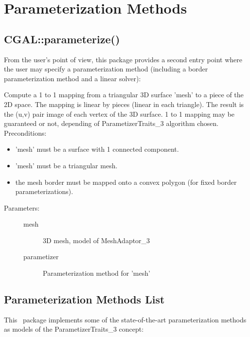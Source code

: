 \section{Parameterization Methods}


\subsection{CGAL::parameterize()}

From the user's point of view, this package provides a second entry point
where the user may specify a parameterization method (including a border
parameterization method and a linear solver):

{
Compute a 1 to 1 mapping from a triangular 3D surface 'mesh' to a piece of the 2D space. The mapping is linear by pieces (linear in each triangle). The result is the (u,v) pair image of each vertex of the 3D surface.
1 to 1 mapping may be guaranteed or not, depending of ParametizerTraits\_3 algorithm chosen.
Preconditions:\begin{itemize}
\item 'mesh' must be a surface with 1 connected component.\item 'mesh' must be a triangular mesh.\item the mesh border must be mapped onto a convex polygon (for fixed border parameterizations).\end{itemize}
}
\begin{description}
\item[Parameters: ]
\begin{description}
\item[mesh]3D mesh, model of MeshAdaptor\_3 \item[parametizer]Parameterization method for 'mesh' \end{description}
\end{description}


\subsection{Parameterization Methods List}

This \cgal\ package implements some of the state-of-the-art
parameterization methods as models of the ParametizerTraits\_3 concept:

